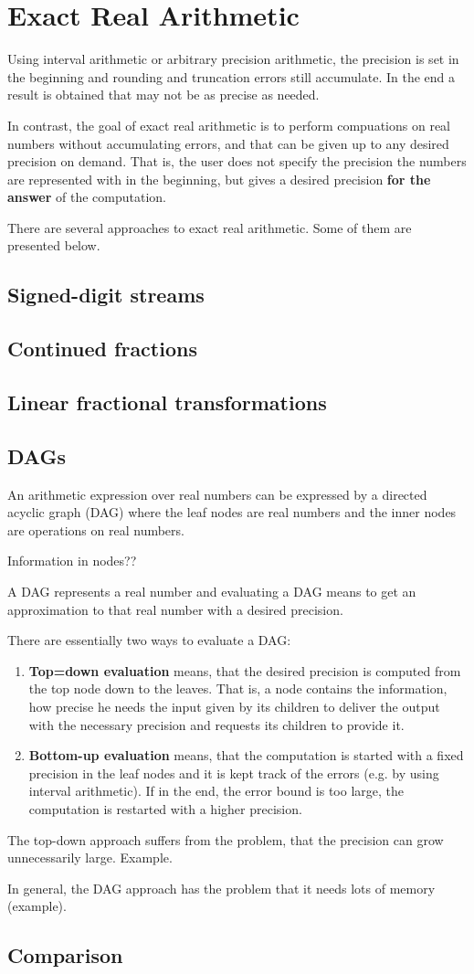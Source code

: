 \section{Exact Real Arithmetic}\label{sec:exact real arithmetic}
	Using interval arithmetic or arbitrary precision arithmetic, 
	the precision is set in the beginning and rounding and truncation errors still accumulate.
	In the end a result is obtained that may not be as precise as needed.

	In contrast, the goal of exact real arithmetic is to perform compuations on real numbers without 
	accumulating errors, and that can be given up to any desired precision on demand.
	That is, the user does not specify the precision the numbers are represented with in the beginning,
	but gives a desired precision \textbf{for the answer} of the computation.

	There are several approaches to exact real arithmetic.
	Some of them are presented below. 

	\subsection{Signed-digit streams}
	\subsection{Continued fractions}
	\subsection{Linear fractional transformations}
	\subsection{DAGs}
		An arithmetic expression over real numbers can be expressed by a directed acyclic graph (DAG)
		where the leaf nodes are real numbers and the inner nodes are operations on real numbers.
		
		Information in nodes??

		A DAG represents a real number and evaluating a DAG means to get an approximation to that real number
		with a desired precision.

		There are essentially two ways to evaluate a DAG:
		\begin{enumerate}
			\item \textbf{Top=down evaluation} means, that the desired precision is computed from the top node down to the leaves.
			That is, a node contains the information, how precise he needs the input given by its children to deliver the output with the necessary precision and requests its children to provide it.  
			\item \textbf{Bottom-up evaluation} means, that the computation is started with a fixed precision in the leaf nodes 
			and it is kept track of the errors (e.g. by using interval arithmetic). 
			If in the end, the error bound is too large, the computation is restarted with a higher precision. 
		\end{enumerate}
		The top-down approach suffers from the problem, that the precision can grow unnecessarily large.   
		Example.

		In general, the DAG approach has the problem that it needs lots of memory (example).
	\subsection{Comparison}



